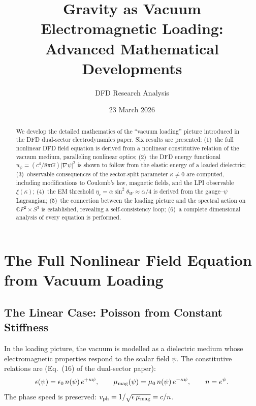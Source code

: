 \documentclass[11pt]{article}
\title{Gravity as Vacuum Electromagnetic Loading:\\
  Advanced Mathematical Developments}
\author{DFD Research Analysis}
\date{23 March 2026}
\begin{document}
\maketitle

\begin{abstract}
We develop the detailed mathematics of the ``vacuum loading'' picture
introduced in the DFD dual-sector electrodynamics paper.
Six results are presented:
(1)~the full nonlinear DFD field equation is derived from a nonlinear
constitutive relation of the vacuum medium, paralleling nonlinear optics;
(2)~the DFD energy functional $u_\psi = (c^4/8\pi G)|\nabla\psi|^2$
is shown to follow from the elastic energy of a loaded dielectric;
(3)~observable consequences of the sector-split parameter $\kappa \neq 0$
are computed, including modifications to Coulomb's law, magnetic fields,
and the LPI observable $\xi(\kappa)$;
(4)~the EM threshold $\eta_c = \alpha\sin^2\theta_W \approx \alpha/4$
is derived from the gauge--$\psi$ Lagrangian;
(5)~the connection between the loading picture and the spectral action
on $\mathbb{C}P^2 \times S^3$ is established, revealing a self-consistency
loop;
(6)~a complete dimensional analysis of every equation is performed.
\end{abstract}

\tableofcontents

\section{The Full Nonlinear Field Equation from Vacuum Loading}
\label{sec:nonlinear}

\subsection{The Linear Case: Poisson from Constant Stiffness}

In the loading picture, the vacuum is modelled as a dielectric medium
whose electromagnetic properties respond to the scalar field $\psi$.
The constitutive relations are (Eq.~(16) of the dual-sector paper):
\begin{equation}
\epsilon(\psi) = \epsilon_0\, n(\psi)\, e^{+\kappa\psi}, \qquad
\mu_{\rm mag}(\psi) = \mu_0\, n(\psi)\, e^{-\kappa\psi}, \qquad
n = e^\psi.
\label{eq:constitutive-linear}
\end{equation}
The phase speed is preserved: $v_{\rm ph} = 1/\sqrt{\epsilon\,\mu_{\rm mag}} = c/n$.
\end{document}
